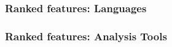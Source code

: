 


\begin{frame}[fragile]
\frametitle{Ranked features: Languages}

\end{frame}


\begin{frame}
\frametitle{Ranked features: Analysis Tools}

\end{frame}



